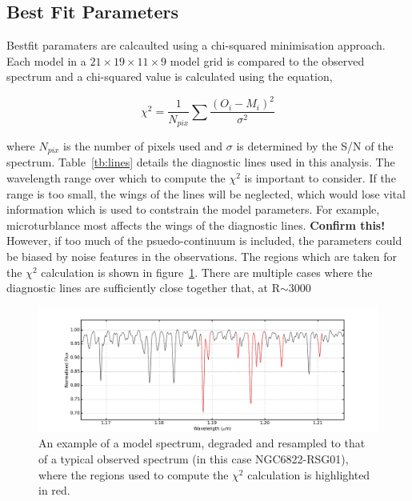 \documentclass[12pt]{article}
\begin{document}
\subsection{Best Fit Parameters} %
\label{sub:best_fit_parameters}

Bestfit paramaters are calcaulted using a chi-squared minimisation approach.
Each model in a $21\times19\times11\times9$ model grid is compared to the observed spectrum
and a chi-squared value is calculated using the equation,

\begin{equation}
    \chi^{2} = \frac{1}{N_{pix}}\sum{\frac{(O_{i} - M_{i})^{2}}{\sigma^{2}}}
\end{equation}

where $N_{pix}$ is the number of pixels used and
$\sigma$ is determined by the S/N of the spectrum.
Table~\ref{tb:lines} details the diagnostic lines used in this analysis.
The wavelength range over which to compute the $\chi^{2}$ is important to consider.
If the range is too small, the wings of the lines will be neglected,
which would lose vital information which is used to contstrain the model parameters.
For example, microturblance most affects the wings of the diagnostic lines.
\textbf{Confirm this!}
However, if too much of the psuedo-continuum is included, the parameters could be biased by noise features in the observations.
The regions which are taken  for the $\chi^{2}$ calculation is shown in figure~\ref{fig:lines}.
There are multiple cases where the diagnostic lines are sufficiently close together that, at R$\sim$3000

\begin{figure}
 \centering
 \includegraphics[width=\textwidth]{Diag-lines}
 \caption{
An example of a model spectrum, degraded and resampled to that of a typical observed spectrum (in this case NGC6822-RSG01), where the regions used to compute the $\chi^{2}$ calculation is highlighted in red.\label{fig:lines}
         }
\end{figure}
\end{document}
